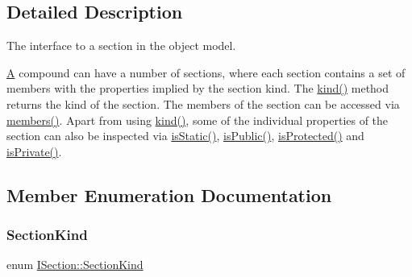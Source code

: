 \subsection{Detailed Description}
The interface to a section in the object model. 

\mbox{\hyperlink{class_a}{A}} compound can have a number of sections, where each section contains a set of members with the properties implied by the section kind. The \mbox{\hyperlink{class_i_section_a3610cc0bc9b90608ade62b84a750ddb4}{kind()}} method returns the kind of the section. The members of the section can be accessed via \mbox{\hyperlink{class_i_section_a1980a8501eb0adbc12f00e251210c39e}{members()}}. Apart from using \mbox{\hyperlink{class_i_section_a3610cc0bc9b90608ade62b84a750ddb4}{kind()}}, some of the individual properties of the section can also be inspected via \mbox{\hyperlink{class_i_section_a8fb73cfd6c2d057b32ce07a89700ecef}{is\+Static()}}, \mbox{\hyperlink{class_i_section_a09f6dd61327d0cf67404cde8476be7a1}{is\+Public()}}, \mbox{\hyperlink{class_i_section_afdd0506cd65ce59c8fecc060ef813592}{is\+Protected()}} and \mbox{\hyperlink{class_i_section_ad205fa5a5150643b8275f3f4ef3759d8}{is\+Private()}}. 

\subsection{Member Enumeration Documentation}
\mbox{\label{class_i_section_af768cbfe7056fadbd0a67d26d0ef84e5}} 
\subsubsection{\texorpdfstring{SectionKind}{SectionKind}\hspace{0.1cm}{\footnotesize\ttfamily [1/2]}}
{\footnotesize\ttfamily enum \mbox{\hyperlink{class_i_section_af768cbfe7056fadbd0a67d26d0ef84e5}{I\+Section\+::\+Section\+Kind}}}

